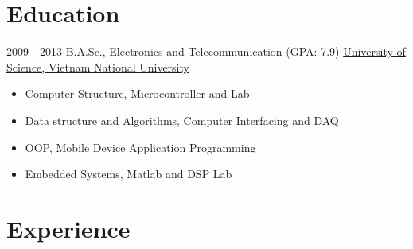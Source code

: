 \documentclass[letterpaper]{twentysecondcv} %
\begin{document}
\makeprofile %

\section{Education}

\begin{twenty} %
	\twentyitem
    	{2009 - 2013}
		{}
        {B.A.Sc., Electronics and Telecommunication \textnormal{(GPA: 7.9)}}
        {\href{http://www.hcmus.edu.vn}{University of Science, Vietnam National University}}
        {}
        {\begin{itemize}
        \item Computer Structure, Microcontroller and Lab
        \item Data structure and Algorithms, Computer Interfacing and DAQ
        \item OOP, Mobile Device Application Programming
        \item Embedded Systems, Matlab and DSP Lab
        \end{itemize}}
\end{twenty}


\section{Experience}
\end{document}

